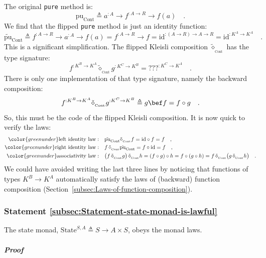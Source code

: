 The original \lstinline!pure! method is:
\[
\text{pu}_{\text{Cont}}\triangleq a^{:A}\rightarrow f^{:A\rightarrow R}\rightarrow f(a)\quad.
\]
We find that the flipped \lstinline!pure! method is just an identity
function:
\[
\tilde{\text{pu}}_{\text{Cont}}\triangleq f^{:A\rightarrow R}\rightarrow a^{:A}\rightarrow f(a)=f^{:A\rightarrow R}\rightarrow f=\text{id}^{:\left(A\rightarrow R\right)\rightarrow A\rightarrow R}=\text{id}^{:K^{A}\rightarrow K^{A}}\quad.
\]
This is a significant simplification. The flipped Kleisli composition
$\tilde{\diamond}_{_{\text{Cont}}}$ has the type signature:
\[
f^{:K^{B}\rightarrow K^{A}}\tilde{\diamond}_{_{\text{Cont}}}g^{:K^{C}\rightarrow K^{B}}=\text{???}^{:K^{C}\rightarrow K^{A}}\quad.
\]
There is only one implementation of that type signature, namely the
backward composition:
\[
f^{:K^{B}\rightarrow K^{A}}\tilde{\diamond}_{_{\text{Cont}}}g^{:K^{C}\rightarrow K^{B}}\triangleq g\bef f=f\circ g\quad.
\]
So, this must be the code of the flipped Kleisli composition. It is
now quick to verify the laws:
\begin{align*}
{\color{greenunder}\text{left identity law}:}\quad & \tilde{\text{pu}}_{\text{Cont}}\tilde{\diamond}_{_{\text{Cont}}}f=\text{id}\circ f=f\quad,\\
{\color{greenunder}\text{right identity law}:}\quad & f\,\tilde{\diamond}_{_{\text{Cont}}}\tilde{\text{pu}}_{\text{Cont}}=f\circ\text{id}=f\quad,\\
{\color{greenunder}\text{associativity law}:}\quad & \big(f\,\tilde{\diamond}_{_{\text{Cont}}}g\big)\,\tilde{\diamond}_{_{\text{Cont}}}h=(f\circ g)\circ h=f\circ(g\circ h)=f\,\tilde{\diamond}_{_{\text{Cont}}}\big(g\,\tilde{\diamond}_{_{\text{Cont}}}h\big)\quad.
\end{align*}
We could have avoided writing the last three lines by noticing that
functions of types $K^{B}\rightarrow K^{A}$ automatically satisfy
the laws of (backward) function composition (Section~\ref{subsec:Laws-of-function-composition}).

\subsubsection{Statement \label{subsec:Statement-state-monad-is-lawful}\ref{subsec:Statement-state-monad-is-lawful}}

The state monad, $\text{State}^{S,A}\triangleq S\rightarrow A\times S$,
obeys the monad laws.

\subparagraph{Proof}

